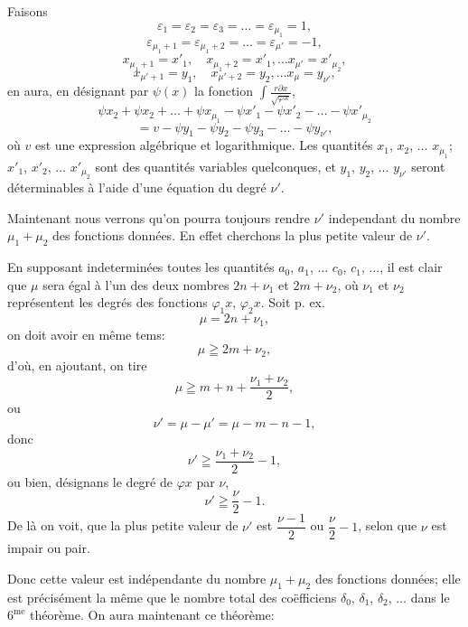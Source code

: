 \documentclass{article}
\begin{document}
Faisons
\[ \varepsilon_1 = \varepsilon_2 = \varepsilon_3 = \ldots = \varepsilon_{\mu_1} = 1, \]
\[ \varepsilon_{\mu_1+1} = \varepsilon_{\mu_1+2} = \ldots = \varepsilon_{\mu'} = -1, \]
\[ x_{\mu_1+1} = x'_1, \quad x_{\mu_1+2} = x'_1, \ldots x_{\mu'} = x'_{\mu_2}, \]
\[ x_{\mu'+1} = y_1, \quad x_{\mu'+2} = y_2, \ldots x_\mu = y_{\nu'}, \]
en aura, en désignant par $\psi(x)$ la fonction $\displaystyle\int \frac{r\partial x}{\sqrt{\varphi x}}$,
\[ \psi x_2 + \psi x_2 + \ldots + \psi x_{\mu_1} - \psi x'_1 - \psi x'_2 - \ldots - \psi x'_{\mu_2} \tag{37} \]
\[ = v - \psi y_1 - \psi y_2 - \psi y_3 - \ldots - \psi y_{\nu'}, \]
où $v$ est une expression algébrique et logarithmique. Les quantités $x_1$, $x_2$, $\ldots$ $x_{\mu_1}$; $x'_1$, $x'_2$, $\ldots$ $x'_{\mu_2}$ sont des quantités variables quelconques, et $y_1$, $y_2$, $\ldots$ $y_{\nu'}$ seront déterminables à l'aide d'une équation du degré $\nu'$.

Maintenant nous verrons qu'on pourra toujours rendre $\nu'$ independant du nombre $\mu_1+\mu_2$ des fonctions données. En effet cherchons la plus petite valeur de $\nu'$.

En supposant indeterminées toutes les quantités $a_0$, $a_1$, $\ldots$ $c_0$, $c_1$, $\ldots$, il est clair que $\mu$ sera égal à l'un des deux nombres $2n+\nu_1$ et $2m+\nu_2$, où $\nu_1$ et $\nu_2$ représentent les degrés des fonctions $\varphi_1 x$, $\varphi_2 x$. Soit p. ex.
\[ \mu = 2n+\nu_1, \]
on doit avoir en même tems:
\[ \mu \geqq 2m+\nu_2, \]
d'où, en ajoutant, on tire
\[ \mu \geqq m+n+\frac{\nu_1+\nu_2}{2}, \]
ou
\[ \nu' = \mu-\mu' = \mu-m-n-1, \]
donc
\[ \nu' \geqq \frac{\nu_1+\nu_2}{2}-1, \]
ou bien, désignans le degré de $\varphi x$ par $\nu$,
\[ \nu' \geqq \frac{\nu}{2}-1. \tag{38} \]
De là on voit, que la plus petite valeur de $\nu'$ est $\dfrac{\nu-1}{2}$ ou $\dfrac{\nu}{2}-1$, selon que $\nu$ est impair ou pair.

Donc cette valeur est indépendante du nombre $\mu_1+\mu_2$ des fonctions données; elle est précisément la même que le nombre total des
coëfficiens $\delta_0$, $\delta_1$, $\delta_2$, $\ldots$ dans le $6^{\text{me}}$ théorème. On aura maintenant ce théorème:
\end{document}
